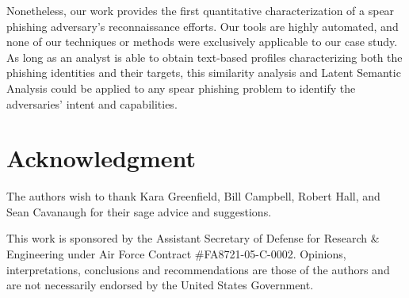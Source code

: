 \documentclass[conference]{IEEEtran}
\begin{document}
Nonetheless, our work provides the first quantitative characterization of a spear phishing adversary's reconnaissance efforts.  Our tools are highly automated, 
and none of our techniques or methods were exclusively applicable to our case study.  As long as an analyst is able to obtain text-based profiles characterizing both the phishing identities and their targets, this similarity analysis and Latent Semantic Analysis could be applied to any 
spear phishing problem to identify the adversaries' intent and capabilities.







\section*{Acknowledgment}


The authors wish to thank Kara Greenfield, Bill Campbell, Robert Hall, and Sean Cavanaugh for their sage advice and suggestions.  


This work is sponsored by the Assistant Secretary of Defense for Research \& Engineering under Air Force Contract \#FA8721-05-C-0002. 
Opinions, interpretations, conclusions and recommendations are those of the authors and are not necessarily endorsed by the United States Government.
\end{document}

